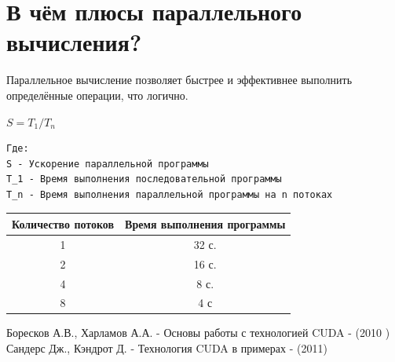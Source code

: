 \documentclass[a4paper, 12pt]{article}
\begin{document}
\section{В чём плюсы параллельного вычисления?}
Параллельное вычисление позволяет быстрее и эффективнее выполнить определённые операции, что логично.

$S=T_1/T_n$
\begin{verbatim}
Где:
S - Ускорение параллельной программы
T_1 - Время выполнения последовательной программы
T_n - Время выполнения параллельной программы на n потоках
\end{verbatim}

\begin{center}
\begin{tabular}{||c c||} 
     \hline
     Количество потоков & Время выполнения программы \\ [0.5ex] 
     \hline\hline
     1 & 32 с.\\ 
     \hline
     2 & 16 с.\\
     \hline
     4 & 8 с. \\
     \hline
     8 & 4 с\\
     \hline
\end{tabular}
\end{center}

\begin{thebibliography}{2}
     Боресков А.В., Харламов А.А. - Основы работы с технологией CUDA - (2010 )
     Сандерс Дж., Кэндрот Д. - Технология CUDA в примерах - (2011)
\end{thebibliography}
\end{document}
